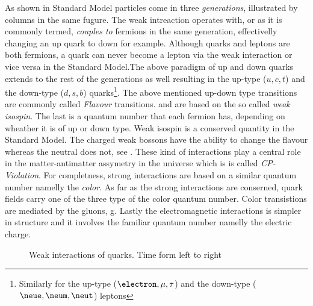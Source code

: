 As shown in  Standard Model particles come in three {\it generations}, illustrated by columns in the same fugure.
The weak intreaction operates with, or as it is commonly termed, {\it couples to} fermions in the same generation, effectivelly
changing an up quark to down for example. Although quarks and leptons are both fermions, a quark can never become a lepton via
the weak interaction or vice versa in the Standard Model.The above paradigm of up and down quarks extends to the rest of the
generations as well resulting in the up-type ($u,c,t$) and the down-type ($d,s,b$) quarks\footnote{Similarly for the  up-type ($\electron,\mu,\tau$)
and the down-type ($\neue,\neum,\neut$) leptons}. The above mentioned up-down type transitions are commonly called {\it Flavour} transitions.
and are based on the so called {\it weak isospin}. The last is a quantum number that each fermion has, depending on
wheather it is of up or down type. Weak isospin is a conserved quantity in the Standard Model. The charged weak bossons \Wpm have
the ability to change the flavour whereas the neutral \Z  does not, see . These kind of interactions play a central role
in the matter-antimatter assymetry in the universe which is is called {\it CP-Violation}. For completness, strong interactions are
based on a similar quantum number namelly the {\it color}. As far as the strong interactions are conserned, quark fields carry one
of the three type of the color quantum number. Color transistions are mediated by the gluons, g. Lastly the electromagnetic interactions
is simpler in structure and it involves the familiar quantum number namelly the electric charge.

\begin{figure}[h]
  {\sffamily }
  \caption{Weak interactions of quarks. Time form left to right}
  \label{WeakInteractions}
\end{figure}

